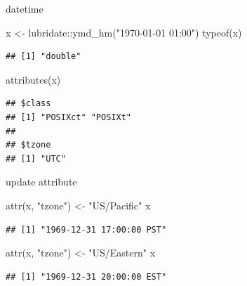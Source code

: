 \documentclass[
  ignorenonframetext,
]{beamer}
\newenvironment{Shaded}{\begin{snugshade}}{\end{snugshade}}
\newcommand{\FunctionTok}[1]{\textcolor[rgb]{0.00,0.00,0.00}{#1}}
\newcommand{\NormalTok}[1]{#1}
\newcommand{\OtherTok}[1]{\textcolor[rgb]{0.56,0.35,0.01}{#1}}
\newcommand{\SpecialCharTok}[1]{\textcolor[rgb]{0.00,0.00,0.00}{#1}}
\newcommand{\StringTok}[1]{\textcolor[rgb]{0.31,0.60,0.02}{#1}}
\begin{document}
\begin{frame}[fragile]{datetime}
\protect\hypertarget{datetime}{}
\begin{Shaded}
\begin{Highlighting}[]
\NormalTok{x }\OtherTok{\textless{}{-}}\NormalTok{ lubridate}\SpecialCharTok{::}\FunctionTok{ymd\_hm}\NormalTok{(}\StringTok{"1970{-}01{-}01 01:00"}\NormalTok{)}
\FunctionTok{typeof}\NormalTok{(x)}
\end{Highlighting}
\end{Shaded}

\begin{verbatim}
## [1] "double"
\end{verbatim}

\begin{Shaded}
\begin{Highlighting}[]
\FunctionTok{attributes}\NormalTok{(x)}
\end{Highlighting}
\end{Shaded}

\begin{verbatim}
## $class
## [1] "POSIXct" "POSIXt" 
## 
## $tzone
## [1] "UTC"
\end{verbatim}
\end{frame}

\begin{frame}[fragile]{update attribute}
\protect\hypertarget{update-attribute}{}
\begin{Shaded}
\begin{Highlighting}[]
\FunctionTok{attr}\NormalTok{(x, }\StringTok{"tzone"}\NormalTok{) }\OtherTok{\textless{}{-}} \StringTok{"US/Pacific"}
\NormalTok{x}
\end{Highlighting}
\end{Shaded}

\begin{verbatim}
## [1] "1969-12-31 17:00:00 PST"
\end{verbatim}

\begin{Shaded}
\begin{Highlighting}[]
\FunctionTok{attr}\NormalTok{(x, }\StringTok{"tzone"}\NormalTok{) }\OtherTok{\textless{}{-}} \StringTok{"US/Eastern"}
\NormalTok{x}
\end{Highlighting}
\end{Shaded}

\begin{verbatim}
## [1] "1969-12-31 20:00:00 EST"
\end{verbatim}
\end{frame}
\end{document}
